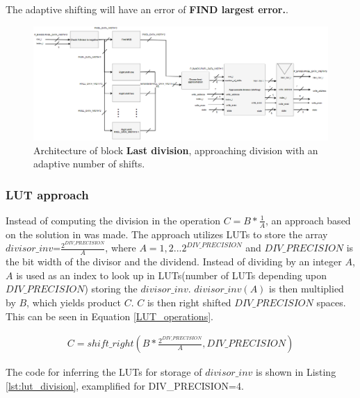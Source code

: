 The adaptive shifting will have an error of \textbf{FIND largest error.}. 



\begin{figure}[H]
\centering
   \includegraphics[scale=0.5]{images/approximate_division/last_division.PNG}
  \caption{Architecture of block \textbf{Last division}, approaching division with an adaptive number of shifts.   } 
  \label{fig:adaptive_shifting}
\end{figure}


\subsubsection{LUT approach}
\label{sec:LUT_division}
Instead of computing the division in the operation $C= B*\frac{1}{A}$, an approach based on the solution in \cite{cite:how_to_implement_division} was made. The approach utilizes LUTs to store the array $divisor\_inv$=$\frac{2^{DIV\_PRECISION}}{A}$, where $A=1,2...2^{DIV\_PRECISION}$ and $DIV\_PRECISION$ is the bit width of the divisor and the dividend. Instead of dividing by an integer $A$, $A$ is used as an index to look up in LUTs(number of LUTs depending upon $DIV\_PRECISION$) storing the $divisor\_inv$. $divisor\_inv(A)$ is then multiplied by $B$, which yields product $C$. $C$ is then right shifted $DIV\_PRECISION$ spaces. This can be seen in Equation \ref{LUT_operations}.

\begin{equation} \label{LUT_operations}
\begin{split}
C= shift\_right(B*\frac{2^{DIV\_PRECISION}}{A},DIV\_PRECISION)
\end{split}
\end{equation}

The code for inferring the LUTs for storage of $divisor\_inv$ is shown in Listing \ref{lst:lut_division}, examplified for DIV\_PRECISION=4.  

